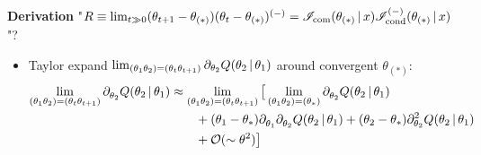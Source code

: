 \begin{frame} [t]
      {\bf Derivation}  
      "$
           R \equiv 
        \lim _{t \gg 0}
        ( \theta _{t+1} - 
          \theta _{(*)}) 
        ( \theta _{t} - 
          \theta _{(*)})
           ^{(-)}
        = 
        \mathscr {I} _{\text{com}} 
           ( \theta _{(*)} \,\vert\, x )
        \mathscr {I} _{\text{cond}} ^{(-)}
           ( \theta _{(*)} \,\vert\, x )
      $"?
      \begin{itemize}
    \item Taylor expand 
          $ \lim _{ ( \theta _{1} 
                      \theta _{2} 
                    )
                    = ( \theta _{t} 
                        \theta _{t+1} 
                      )
                  }
            \partial _{\theta _{2}}
              Q ( \theta _{2} \,\vert\, \theta _{1} )
          $ around convergent 
          $ \theta _{(*)} $:
        { \footnotesize
        \begin{align*}
          \lim _{ ( \theta _{1} 
                    \theta _{2} 
                  )
          = ( \theta _{t} 
                     \theta _{t+1} 
                   )
             }
            \del
             { Q \conditional 
                 {\theta _{2}} {\theta _{1}}
             }
             {\theta _{2} }  {}
        & \approx 
          \lim _{ ( \theta _{1} 
                    \theta _{2} 
                  )
                 = ( \theta _{t} 
                     \theta _{t+1} 
                   )
                }
         \big[
          \lim _{ ( \theta _{1} 
                    \theta _{2} 
                  )
          = ( \theta _{*} )
                }
            \del
             { Q \conditional 
                 {\theta _{2}} {\theta _{1}}
             }
             {\theta _{2}} {}
        \\ & \quad \quad  
            + (\theta _{1} - \theta _{*})
              \del {} {\theta _{1}} {}
              \del  
                { Q \conditional 
                     {\theta _{2}} 
                     {\theta _{1}}
                } 
                { \theta _{2} } {}
            + (\theta _{2} - \theta _{*})
              \del  
                { Q \conditional 
                     {\theta _{2}} 
                     {\theta _{1}}
                } 
                { \theta _{2} } 
                {2}
        \\ & \quad \quad   
            + \mathcal {O} 
              ( \sim \theta ^{2}) \big ]

\end{align*}}
\end{itemize}
\end{frame}

